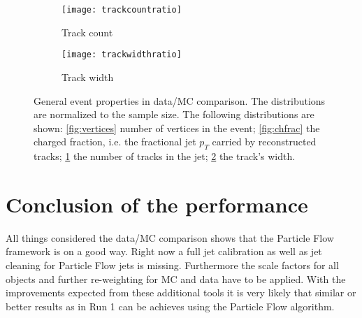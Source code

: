 \begin{figure}[h]
\centering
\begin{subfigure}[b]{0.5\figwidth}
\texttt{[image: trackcountratio]}
\caption[Track count]{Track count}
\label{fig:trackcount}
\end{subfigure}
\quad
\begin{subfigure}[b]{0.5\figwidth}
\texttt{[image: trackwidthratio]}
\caption[trackwidth]{Track width}
\label{fig:trackwidth}
\end{subfigure}
\caption{General event properties in data/MC comparison. The distributions are normalized to the sample size. The following distributions are shown: \ref{fig:vertices} number of vertices in the event; \ref{fig:chfrac} the charged fraction, i.e. the fractional jet $p_T$ carried by reconstructed tracks; \ref{fig:trackcount} the number of tracks in the jet; \ref{fig:trackwidth} the track's width.}
\label{fig:generalproperties}
\end{figure}


\section{Conclusion of the performance}

All things considered the data/MC comparison shows that the Particle Flow framework is on a good way. Right now a full jet calibration as well as jet cleaning for Particle Flow jets is missing. Furthermore the scale factors for all objects and further re-weighting for MC and data have to be applied.
With the improvements expected from these additional tools it is very likely that similar or better results as in Run 1 can be achieves using the Particle Flow algorithm.


\label{results}
